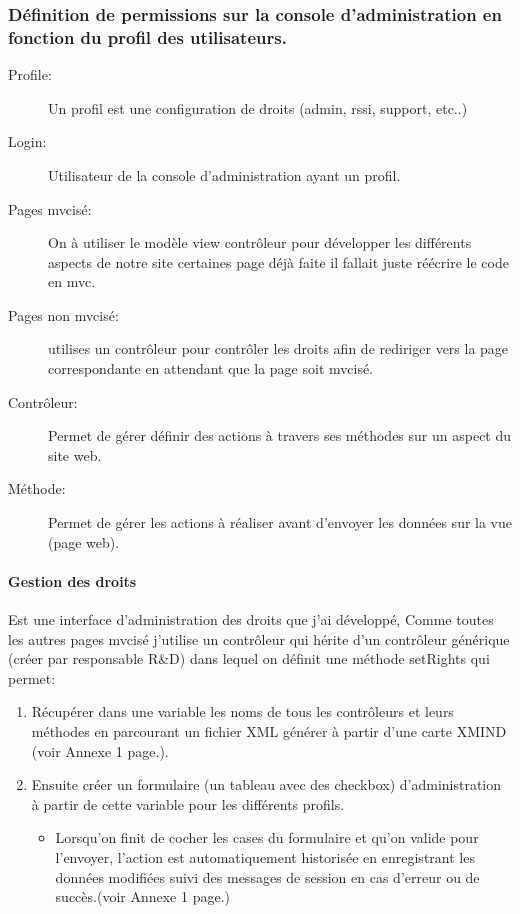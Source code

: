 \subsubsection{Définition de permissions sur la console d'administration en fonction du profil des utilisateurs.}
\begin{description}

\item[Profile:] Un profil est une configuration de droits (admin, rssi, support, etc..)

\item[Login:] Utilisateur de la console d'administration ayant un profil.

\item[Pages mvcisé:] On à utiliser le modèle view contrôleur pour développer les différents aspects de notre site certaines page déjà faite il fallait juste réécrire le code en mvc.

\item[Pages non mvcisé:] utilises un contrôleur pour contrôler les droits afin de rediriger vers la page correspondante en attendant que la page soit mvcisé.

\item[Contrôleur:] Permet de gérer définir des actions à travers ses méthodes sur un aspect du site web.

\item[Méthode:] Permet de gérer les actions à réaliser avant d'envoyer les données sur la vue (page web).
\end{description}

\paragraph{Gestion des droits}
Est une interface d'administration des droits que j'ai développé,
Comme toutes les autres pages mvcisé j'utilise un contrôleur qui hérite d'un contrôleur générique (créer par responsable R\&D) dans lequel on définit une méthode setRights qui permet:
\begin{enumerate}


\item Récupérer dans une variable les noms de tous les contrôleurs et leurs méthodes en parcourant un fichier XML générer à partir d'une carte XMIND (voir Annexe 1 page.\pageref{xmind}).
\item Ensuite créer un formulaire (un tableau avec des checkbox) d'administration à partir de cette variable pour les différents profils.
	\begin{itemize}
	\item Lorsqu'on finit de cocher les cases du formulaire et qu'on valide pour l'envoyer, l'action est automatiquement historisée en enregistrant les données modifiées suivi des messages de session en cas d'erreur ou de succès.(voir Annexe 1 page.\pageref{organigramme})
	\end{itemize}
\end{enumerate}
